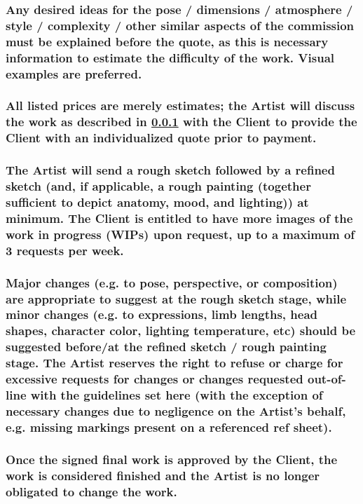\documentclass{article}
\begin{document}
\begin{flushleft}
		\subsubsection[Work Description]{\normalfont Any desired ideas for the pose / dimensions / atmosphere / style / complexity / other similar aspects of the commission must be explained before the quote, as this is necessary information to estimate the difficulty of the work. Visual examples are preferred.}\label{workdesc}
		
		\subsubsection[Estimations and Quotes]{\normalfont All listed prices are merely estimates; the Artist will discuss the work as described in \ref{workdesc} with the Client to provide the Client with an individualized quote prior to payment.}

		\subsubsection[WIPs]{\normalfont The Artist will send a rough sketch followed by a refined sketch (and, if applicable, a rough painting (together sufficient to depict anatomy, mood, and lighting)) at minimum. The Client is entitled to have more images of the work in progress (WIPs) upon request, up to a maximum of 3 requests per week.}

		\subsubsection[Changes and Feedback]{\normalfont Major changes (e.g. to pose, perspective, or composition) are appropriate to suggest at the rough sketch stage, while minor changes (e.g. to expressions, limb lengths, head shapes, character color, lighting temperature, etc) should be suggested before/at the refined sketch / rough painting stage. The Artist reserves the right to refuse or charge for excessive requests for changes or changes requested out-of-line with the guidelines set here (with the exception of necessary changes due to negligence on the Artist's behalf, e.g. missing markings present on a referenced ref sheet).}

		\subsubsection[Concluding Work]{\normalfont Once the signed final work is approved by the Client, the work is considered finished and the Artist is no longer obligated to change the work.}


\end{flushleft}
\end{document}
